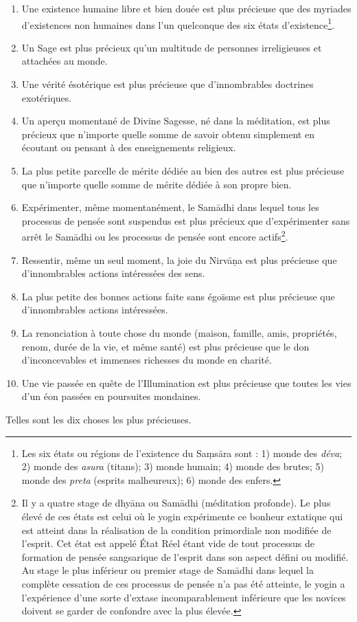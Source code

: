 \documentclass[10pt]{book}
\begin{document}
\begin{enumerate}[1.-]
\item Une existence humaine libre et bien douée est plus précieuse que des myriades d'existences non humaines dans l'un quelconque des six états d'existence\footnote{Les six états ou régions de l'existence du Saṃsāra sont : 1) monde des \textit{déva}; 2) monde des \textit{asura} (titans); 3) monde humain; 4) monde des brutes; 5) monde des \textit{preta} (esprits malheureux); 6) monde des enfers.}.
\item Un Sage est plus précieux qu'un multitude de personnes irreligieuses et attachées au monde.
\item Une vérité ésotérique est plus précieuse que d'innombrables doctrines exotériques.
\item Un aperçu momentané de Divine Sagesse, né dans la méditation, est plus précieux que n'importe quelle somme de savoir obtenu simplement en écoutant ou pensant à des enseignements religieux.
\item La plus petite parcelle de mérite dédiée au bien des autres est plus précieuse que n'importe quelle somme de mérite dédiée à son propre bien.
\item Expérimenter, même momentanément, le Samādhi dans lequel tous les processus de pensée sont suspendus est plus précieux que d'expérimenter sans arrêt le Samādhi ou les processus de pensée sont encore actifs\footnote{Il y a quatre stage de dhyāna ou Samādhi (méditation profonde). Le plus élevé de ces états est celui où le yogin expérimente ce bonheur extatique qui est atteint dans la réalisation de la condition primordiale non modifiée de l'esprit. Cet état est appelé État Réel étant vide de tout processus de formation de pensée sangsarique de l'esprit dans son aspect défini ou modifié. Au stage le plus inférieur ou premier stage de Samādhi dans lequel la complète cessation de ces processus de pensée n'a pas été atteinte, le yogin a l'expérience d'une sorte d'extase incomparablement inférieure que les novices doivent se garder de confondre avec la plus élevée.}. %
\item Ressentir, même un seul moment, la joie du Nirvāṇa est plus précieuse que d'innombrables actions intéressées des sens.
\item La plus petite des bonnes actions faite sans égoïsme est plus précieuse que d'innombrables actions intéressées.
\item La renonciation à toute chose du monde (maison, famille, amis, propriétés, renom, durée de la vie, et même santé) est plus précieuse que le don d'inconcevables et immenses richesses du monde en charité.
\item Une vie passée en quête de l'Illumination est plus précieuse que toutes les vies d'un éon passées en poursuites mondaines.
\end{enumerate}
Telles sont les dix choses les plus précieuses.
\end{document}
